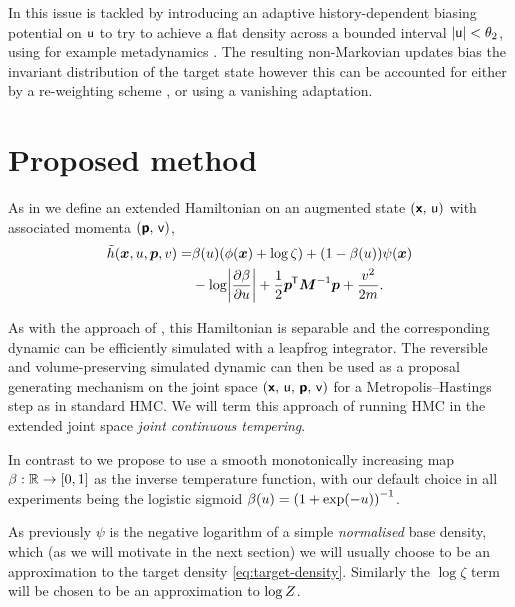 In \citep{gobbo2015extended} this issue is tackled by introducing an adaptive history-dependent biasing potential on $\mathsf{u}$ to try to achieve a flat density across a bounded interval $|\mathsf{u}| < \theta_2$, using for example metadynamics \citep{laio2002escaping}. The resulting non-Markovian updates bias the invariant distribution of the target state however this can be accounted for either by a re-weighting scheme \citep{bonomi2009reconstructing}, or using a vanishing adaptation.

\section{Proposed method}\label{sec:proposed-approach}

As in \citep{gobbo2015extended} we define an extended Hamiltonian on an augmented state $(\boldsymbol{\mathsf{x}},\,\mathsf{u})$ with associated momenta $(\boldsymbol{\mathsf{p}},\,\mathsf{v})$,
\begin{align}\nonumber
  \extended{\hamiltonian}(\vct{x},u,\vct{p},v) =&
  \beta(u) \lpa \phi(\vct{x}) + \log\zeta\rpa + 
  \lpa 1 - \beta(u) \rpa \psi(\vct{x}) \\ \label{eq:extended-hamiltonian}
  &- \log\left|\pd{\beta}{u}\right| +
  \frac{1}{2} \vct{p}\tr\mtx{M}^{-1}\vct{p} + \frac{v^2}{2m}.
\end{align}

As with the approach of \citep{gobbo2015extended}, this Hamiltonian is separable and the corresponding dynamic can be efficiently simulated with a leapfrog integrator. The reversible and volume-preserving simulated dynamic can then be used as a proposal generating mechanism on the joint space $(\boldsymbol{\mathsf{x}},\,\mathsf{u},\,\boldsymbol{\mathsf{p}},\,\mathsf{v})$ for a Metropolis--Hastings step as in standard \ac{HMC}. We will term this approach of running \ac{HMC} in the extended joint space \emph{joint continuous tempering}.

In contrast to \citep{gobbo2015extended} we propose to use a smooth monotonically increasing map $\beta : \mathbb{R} \to [0, 1]$ as the inverse temperature function, with our default choice in all experiments being the logistic sigmoid $\beta(u) = \lpa 1 + \exp(-u)\rpa^{-1}$.

As previously $\psi$ is the negative logarithm of a simple \emph{normalised} base density, which (as we will motivate in the next section) we will usually choose to be an approximation to the target density \eqref{eq:target-density}. Similarly the $\log\zeta$ term will be chosen to be an approximation to $\log Z$.

